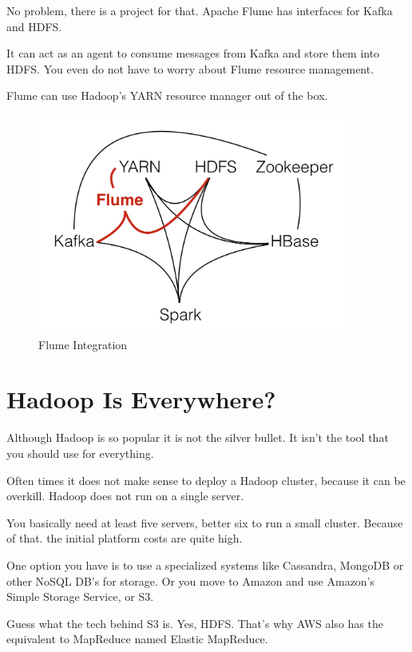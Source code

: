 \documentclass[12pt, numbers=noenddot]{scrreprt} %
\begin{document}
No problem, there is a project for that. Apache Flume has interfaces for Kafka and HDFS.

It can act as an agent to consume messages from Kafka and store them into HDFS. You even do not have to worry about Flume resource management.

Flume can use Hadoop’s YARN resource manager out of the box.

\begin{figure}[htbp]
  \centering
     \includegraphics[width=0.9\textwidth]{images/Hadoop-Ecosystem-Connections-Flume.png}
  \caption{Flume Integration}
  \label{fig:Bild1}
\end{figure}



\section{Hadoop Is Everywhere?}

Although Hadoop is so popular it is not the silver bullet. It isn’t the tool that you should use for everything.

Often times it does not make sense to deploy a Hadoop cluster, because it can be overkill. Hadoop does not run on a single server.

You basically need at least five servers, better six to run a small cluster. Because of that. the initial platform costs are quite high.

One option you have is to use a specialized systems like Cassandra, MongoDB or other NoSQL DB’s for storage. Or you move to Amazon and use Amazon’s Simple Storage Service, or S3.

Guess what the tech behind S3 is. Yes, HDFS. That’s why AWS also has the equivalent to MapReduce named Elastic MapReduce.
\end{document}
